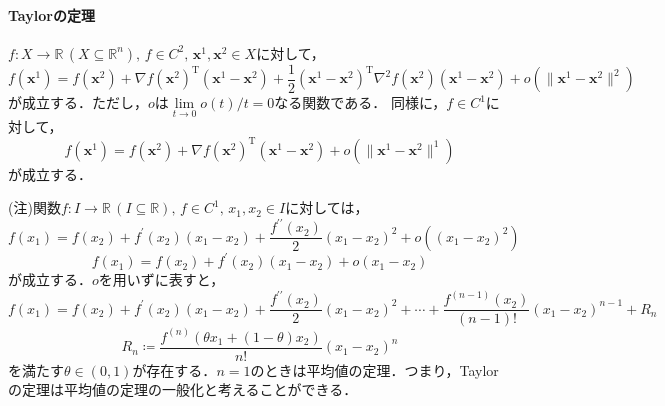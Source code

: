 \documentclass{jsreport}
\begin{document}
\paragraph{Taylorの定理}
$f: X \rightarrow \mathbb{R} \, (X \subseteq \mathbb{R}^n), \, f \in C^2, \, \bm{x}^1, \bm{x}^2 \in X$に対して，
\begin{equation}
  f(\bm{x}^1) = f(\bm{x}^2) + \nabla f(\bm{x}^2)^{\mathrm{T}} (\bm{x}^1 - \bm{x}^2) + \frac{1}{2} (\bm{x}^1 - \bm{x}^2)^{\mathrm{T}} \nabla^2 f(\bm{x}^2) (\bm{x}^1 - \bm{x}^2) + o(\|\bm{x}^1 - \bm{x}^2 \|^2) \nonumber
\end{equation}
が成立する．ただし，$o$は$\lim\limits_{t \rightarrow 0} o(t) / t = 0$なる関数である．
同様に，$f \in C^1$に対して，
\begin{equation}
    f(\bm{x}^1) = f(\bm{x}^2) + \nabla f(\bm{x}^2)^{\mathrm{T}} (\bm{x}^1 - \bm{x}^2) + o(\|\bm{x}^1 - \bm{x}^2 \|^1) \nonumber
\end{equation}
が成立する．

(注)関数$f: I \rightarrow \mathbb{R} \, (I \subseteq \mathbb{R}), \, f \in C^1, \, x_1, x_2 \in I$に対しては，
\begin{equation}
  f(x_1) = f(x_2) + f^{\prime}(x_2)(x_1 - x_2) + \frac{f^{\prime \prime}(x_2)}{2}(x_1 - x_2)^2 + o((x_1 - x_2)^2) \nonumber
\end{equation}
\begin{equation}
  f(x_1) = f(x_2) + f^{\prime}(x_2)(x_1 - x_2) + o(x_1 - x_2) \nonumber
\end{equation}
が成立する．$o$を用いずに表すと，
\begin{equation}
  f(x_1) = f(x_2) + f^{\prime}(x_2)(x_1 - x_2) + \frac{f^{\prime \prime}(x_2)}{2}(x_1 - x_2)^2 + \cdots + \frac{f^{(n - 1)}(x_2)}{(n - 1)!}(x_1 - x_2)^{n - 1} + R_n \nonumber
\end{equation}
\begin{equation}
  R_n \coloneqq \frac{f^{(n)}(\theta x_1 + (1 - \theta)x_2)}{n!}(x_1 - x_2)^n \nonumber
\end{equation}
を満たす$\theta \in (0, 1)$が存在する．$n = 1$のときは平均値の定理．つまり，Taylorの定理は平均値の定理の一般化と考えることができる．
\end{document}
